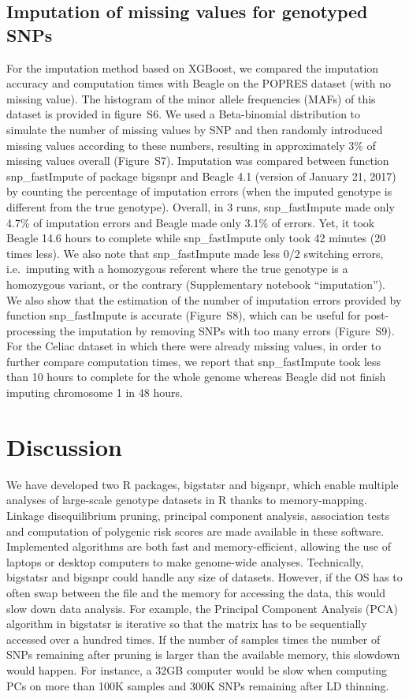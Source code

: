 \documentclass{bioinfo}
\begin{document}
\subsection{Imputation of missing values for genotyped SNPs}\label{sec:impute}

For the imputation method based on XGBoost, we compared  the imputation accuracy and computation times with Beagle on the POPRES dataset (with no missing value). 
The histogram of the minor allele frequencies (MAFs) of this dataset is provided in figure~S6. 
We used a Beta-binomial distribution to simulate the number of missing values by SNP and then randomly introduced missing values according to these numbers, resulting in approximately 3\% of missing values overall (Figure~S7).
Imputation was compared between function snp\_fastImpute of package bigsnpr and Beagle 4.1 (version of January 21, 2017) by counting the percentage of imputation errors (when the imputed genotype is different from the true genotype).
Overall, in 3 runs, snp\_fastImpute made only 4.7\% of imputation errors and Beagle made only 3.1\% of errors. Yet, it took Beagle 14.6 hours to complete while snp\_fastImpute only took 42 minutes (20 times less). 
We also note that snp\_fastImpute made less 0/2 switching errors, i.e.\ imputing with a homozygous referent where the true genotype is a homozygous variant, or the contrary (Supplementary notebook ``imputation'').
We also show that the estimation of the number of imputation errors provided by function snp\_fastImpute is accurate (Figure~S8), which can be useful for post-processing the imputation by removing SNPs with too many errors (Figure~S9).
For the Celiac dataset in which there were already missing values, in order to further compare computation times, we report that snp\_fastImpute took less than 10 hours to complete for the whole genome whereas Beagle did not finish imputing chromosome 1 in 48 hours. 


\section{Discussion}

We have developed two R packages, bigstatsr and bigsnpr, which enable multiple analyses of large-scale genotype datasets in R thanks to memory-mapping. Linkage disequilibrium pruning, principal component analysis, association tests and computation of polygenic risk scores are made available in these software. Implemented algorithms are both fast and memory-efficient, allowing the use of laptops or desktop computers to make genome-wide analyses.
Technically, bigstatsr and bigsnpr could handle any size of datasets. However, if the OS has to often swap between the file and the memory for accessing the data, this would slow down data analysis. For example, the Principal Component Analysis (PCA) algorithm in bigstatsr is iterative so that the matrix has to be sequentially accessed over a hundred times. If the number of samples times the number of SNPs remaining after pruning is larger than the available memory, this slowdown would happen. For instance, a 32GB computer would be slow when computing PCs on more than 100K samples and 300K SNPs remaining after LD thinning.
\end{document}

